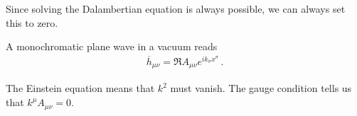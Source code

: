 \documentclass[main.tex]{subfiles}
\begin{document}
Since solving the Dalambertian equation is always possible, 
we can always set this to zero. 

A monochromatic plane wave in a vacuum reads 
%
\begin{align}
\overline{h}_{\mu \nu } = \Re A_{\mu \nu } e^{i k_{\sigma } x^{\sigma }}
\,.
\end{align}

The Einstein equation means that \(k^2\) must vanish. 
The gauge condition tells us that \(k^{\mu }A_{\mu \nu } = 0\). 
\end{document}
